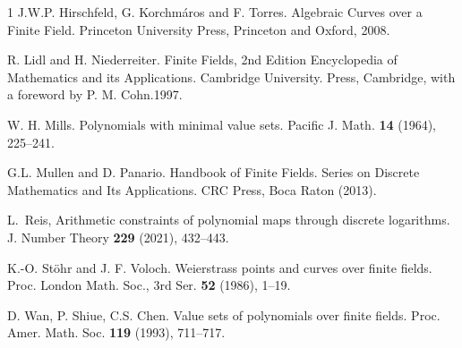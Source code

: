 \documentclass[11pt]{amsart}
\theoremstyle{definition}
\theoremstyle{remark}
\begin{document}
\begin{thebibliography}{1}
 J.W.P. Hirschfeld, G. Korchm\'aros and F. Torres.
\newblock Algebraic Curves over a Finite Field.
\newblock Princeton University Press, Princeton and Oxford, 2008.




 R. Lidl and H. Niederreiter. 
\newblock Finite Fields, 2nd Edition Encyclopedia of Mathematics and its Applications. Cambridge University.
\newblock Press, Cambridge, with a foreword by P. M. Cohn.1997.

 W. H. Mills. 
\newblock Polynomials with minimal value sets.
\newblock Pacific J. Math. {\bf 14} (1964), 225--241.

 G.L. Mullen and D. Panario. 
\newblock Handbook of Finite Fields.
\newblock  Series on Discrete Mathematics and Its Applications. CRC Press, Boca Raton (2013).



 L.~Reis,
\newblock Arithmetic constraints of polynomial maps through discrete logarithms.
\newblock J. Number Theory {\bf 229} (2021), 432--443.

 K.-O. St\"ohr and J. F. Voloch. 
\newblock Weierstrass points and curves over finite fields.
\newblock Proc. London Math. Soc., 3rd Ser. {\bf 52} (1986), 1--19.

 D. Wan, P. Shiue, C.S. Chen.
 \newblock Value sets of polynomials over finite fields.
 \newblock  Proc. Amer. Math. Soc. {\bf 119} (1993), 711--717.



\end{thebibliography}
\end{document}
